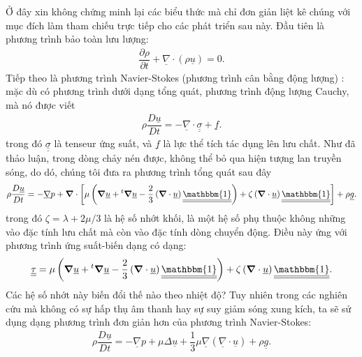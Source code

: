 Ở đây xin không chứng minh lại các biểu thức mà chỉ đơn giản liệt kê chúng với mục đích làm tham chiếu trực tiếp cho các phát triển sau này. Đầu tiên là phương trình bảo toàn lưu lượng:
	\begin{align}\label{eq:conserve_mass}
		\dfrac{\partial\rho}{\partial t}+\underline{\nabla}\cdot\left(\rho\underline{u}\right)=0.
	\end{align}
Tiếp theo là phương trình Navier-Stokes (phương trình cân bằng động lượng) : mặc dù có phương trình dưới dạng tổng quát, phương trình động lượng Cauchy, mà nó được viết
	\begin{align}
		\rho\dfrac{D\underline{u}}{Dt}=-\underline\nabla\cdot\underline{\underline{\sigma}}+\underline{f}.
	\end{align}
trong đó $\underline{\underline{\sigma}}$ là tenseur ứng suất, và $\underline{f}$ là lực thể tích tác dụng lên lưu chất. Như đã thảo luận, trong dòng chảy nén được, không thể bỏ qua hiện tượng lan truyền sóng, do dó, chúng tôi đưa ra phương trình tổng quát sau đây
	\begin{align}\label{eq:nse}
		\rho\dfrac{D\underline{u}}{Dt}=-\underline{\nabla}p+\vnabla\cdot\left[\mu\left(\vnabla\underline{u}+{}^t\vnabla\underline{u}-\dfrac{2}{3}\left(\vnabla\cdot\underline{u}\right)\underline{\underline{\mathbbm{1}}}\right)+\zeta\left(\vnabla\cdot\underline{u}\right)\underline{\underline{\mathbbm{1}}}\right]+\rho\underline{g}.
	\end{align}
trong đó $\zeta=\lambda+2\mu/3$ là hệ số nhớt khối, là một hệ số phụ thuộc không những vào đặc tính lưu chất mà còn vào đặc tính dòng chuyển động. Điều này ứng với phương trình ứng suất-biến dạng có dạng:
	\begin{align}
		\underline{\underline{\tau}}=\mu\left(\vnabla\underline{u}+{}^t\vnabla\underline{u}-\dfrac{2}{3}\left(\vnabla\cdot\underline{u}\right)\underline{\underline{\mathbbm{1}}}\right)+\zeta\left(\vnabla\cdot\underline{u}\right)\underline{\underline{\mathbbm{1}}}.
	\end{align}
Các hệ số nhớt này biến đổi thế nào theo nhiệt độ? Tuy nhiên trong các nghiên cứu mà không có sự hấp thụ âm thanh hay sự suy giảm sóng xung kích, ta sẽ sử dụng dạng phương trình đơn giản hơn của phương trình Navier-Stokes:
	\begin{align}
		\boxed{
			\rho\dfrac{D\underline{u}}{Dt}=-\underline{\nabla}p+\mu\Delta\underline{u}+\dfrac{1}{3}\mu\underline{\nabla}\left(\underline{\nabla}\cdot\underline{u}\right)+\rho\underline{g}.
		}
	\end{align}